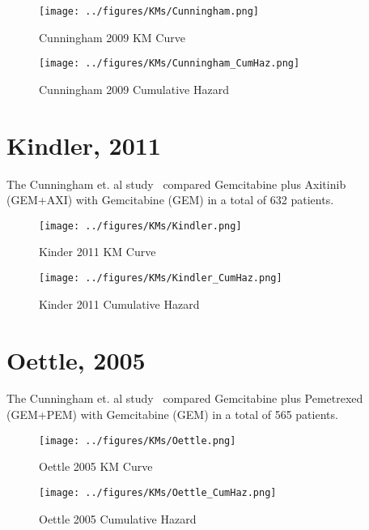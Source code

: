 \begin{figure}
    \center
    \texttt{[image: ../figures/KMs/Cunningham.png]}
    \caption{Cunningham 2009 KM Curve}
    \label{cun2009km}
\end{figure}

\begin{figure}
    \center
    \texttt{[image: ../figures/KMs/Cunningham\_CumHaz.png]}
    \caption{Cunningham 2009 Cumulative Hazard}
    \label{cun2009ch}
\end{figure}

\newpage

\section{Kindler, 2011}
The Cunningham et. al study~\cite{kindler2011} compared Gemcitabine plus Axitinib (GEM+AXI) with Gemcitabine (GEM) in a total of 632 patients. 

\begin{figure}
    \center
    \texttt{[image: ../figures/KMs/Kindler.png]}
    \caption{Kinder 2011 KM Curve}
    \label{kin2011km}
\end{figure}

\begin{figure}
    \center
    \texttt{[image: ../figures/KMs/Kindler\_CumHaz.png]}
    \caption{Kinder 2011 Cumulative Hazard}
    \label{kin2011ch}
\end{figure}

\newpage

\section{Oettle, 2005}
The Cunningham et. al study~\cite{oettle2005} compared Gemcitabine plus Pemetrexed (GEM+PEM) with Gemcitabine (GEM) in a total of 565 patients. 

\begin{figure}
    \center
    \texttt{[image: ../figures/KMs/Oettle.png]}
    \caption{Oettle 2005 KM Curve}
    \label{kin2005km}
\end{figure}

\begin{figure}
    \center
    \texttt{[image: ../figures/KMs/Oettle\_CumHaz.png]}
    \caption{Oettle 2005 Cumulative Hazard}
    \label{kin2005ch}
\end{figure}

